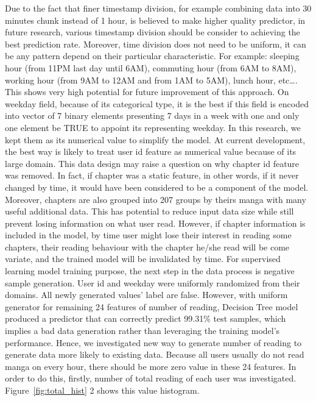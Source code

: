\documentclass[English]{dicomopapers}
\begin{document}
Due to the fact that finer timestamp division, for example combining data into 30 minutes chunk instead of 1 hour, is believed to make higher quality predictor, in future research, various timestamp division should be consider to achieving the best prediction rate. Moreover, time division does not need to be uniform, it can be any pattern depend on their particular characteristic. For example: sleeping hour (from 11PM last day until 6AM), commuting hour (from 6AM to 8AM), working hour (from 9AM to 12AM and from 1AM to 5AM), lunch hour, etc\ldots. This shows very high potential for future improvement of this approach.\newline
On weekday field, because of its categorical type, it is the best if this field is encoded into vector of 7 binary elements presenting 7 days in a week with one and only one element be TRUE to appoint its representing weekday. In this research, we kept them as its numerical value to simplify the model.\newline
At current development, the best way is likely to treat user id feature as numerical value because of its large domain.\newline
This data design may raise a question on why chapter id feature was removed. In fact, if chapter was a static feature, in other words, if it never changed by time, it would have been considered to be a component of the model. Moreover, chapters are also grouped into 207 groups by theirs manga with many useful additional data. This has potential to reduce input data size while still prevent losing information on what user read. However, if chapter information is included in the model, by time user might lose their interest in reading some chapters, their reading behaviour with the chapter he/she read will be come variate, and the trained model will be invalidated by time.\newline
For supervised learning model training purpose, the next step in the data process is negative sample generation. User id and weekday were uniformly randomized from their domains. All newly generated values' label are false. However, with uniform generator for remaining 24 features of number of reading, Decision Tree model produced a predictor that can correctly predict 99.31\% test samples, which implies a bad data generation rather than leveraging the training model's performance. Hence, we investigated new way to generate number of reading to generate data more likely to existing data. Because all users usually do not read manga on every hour, there should be more zero value in these 24 features. In order to do this, firstly, number of total reading of each user was investigated. Figure~\ref{fig:total_hist} 2 shows this value histogram.\newline
\end{document}

